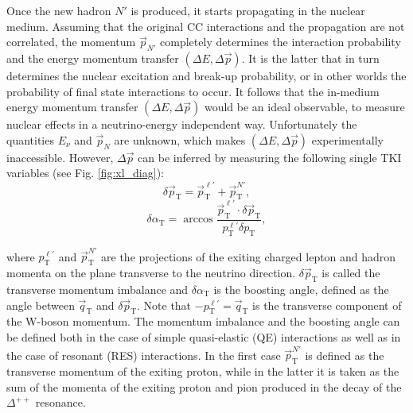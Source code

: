 Once the new hadron $N'$ is produced, it starts propagating in the nuclear medium. Assuming that the original CC interactions and the propagation are not correlated, the momentum  $\Vec{p}_{N'}$ completely determines the interaction probability and the energy momentum transfer $(\Delta E,\Delta \Vec{p})$. It is the latter that in turn determines the nuclear excitation and break-up probability, or in other worlds the probability of final state interactions to occur. It follows that the in-medium energy momentum transfer $(\Delta E,\Delta \Vec{p})$ would be an ideal observable, to measure nuclear effects in a neutrino-energy independent way. Unfortunately the quantities $E_\nu$ and $\Vec{p}_{N}$ are unknown, which makes $(\Delta E,\Delta \Vec{p})$ experimentally inaccessible. However, $\Delta \Vec{p}$ can be inferred by measuring the following single TKI variables (see Fig. \ref{fig:xl_diag}):
\begin{equation}
    \delta \Vec{p}_\text{T} = \Vec{p}_\text{T}^{\ell'}+\Vec{p}_\text{T}^{N'},
\end{equation}
\begin{equation}
    \delta \alpha_\text{T} = \arccos \frac{\Vec{p}_\text{T}^{\ell'} \cdot \delta \Vec{p}_\text{T}}{p_\text{T}^{\ell'}  \delta p_\text{T}},
\end{equation}

where $p_\text{T}^{\ell'}$ and $\Vec{p}_\text{T}^{N'}$ are the projections of the exiting charged lepton and hadron momenta on the plane transverse to the neutrino direction. $\delta \Vec{p}_\text{T}$ is called the transverse momentum imbalance and $\delta \alpha_\text{T}$ is the boosting angle, defined as the angle between $\Vec{q}_\text{T}$ and $\delta \Vec{p}_\text{T}$. Note that $-p_\text{T}^{\ell'} = \Vec{q}_\text{T}$ is the transverse component of the W-boson momentum.  The momentum imbalance and the boosting angle can be defined both in the case of simple quasi-elastic (QE) interactions as well as in the case of resonant (RES) interactions. In the first case $\Vec{p}_\text{T}^{N'}$ is defined as the transverse momentum of the exiting proton, while in the latter it is taken as the sum of the momenta of the exiting proton and pion produced in the decay of the $\Delta^{++}$ resonance.

